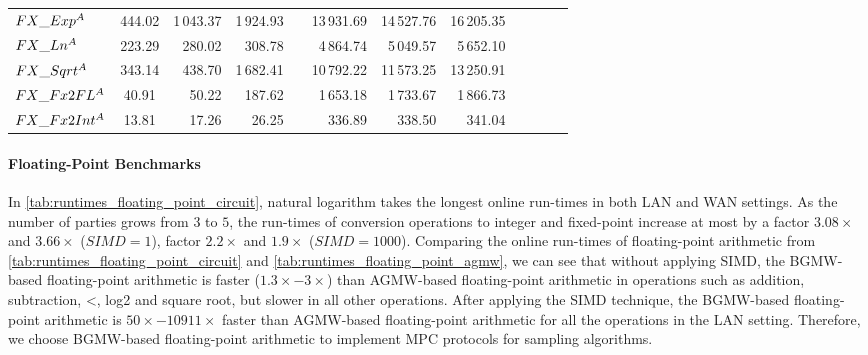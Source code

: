 \begin{table}
{\begin{tabular}{ l c r r r r r r r r r r}
            $FX\_Exp^{A}$                         & 444.02                  & 1\,043.37 & 1\,924.93               &   & 13\,931.69 & 14\,527.76 & 16\,205.35 \\
            $FX\_Ln^{A}$                          & 223.29                  & 280.02    & 308.78                  &   & 4\,864.74  & 5\,049.57  & 5\,652.10  \\
            $FX\_Sqrt^{A}$                        & 343.14                  & 438.70    & 1\,682.41               &   & 10\,792.22 & 11\,573.25 & 13\,250.91 \\
            $FX\_Fx2FL^{A}$                       & 40.91                   & 50.22     & 187.62                  &   & 1\,653.18  & 1\,733.67  & 1\,866.73  \\
            $FX\_Fx2Int^{A}$                      & 13.81                   & 17.26     & 26.25                   &   & 336.89     & 338.50     & 341.04     \\
            \bottomrule
        \end{tabular}
    }
\end{table}
\FloatBarrier

\paragraph{Floating-Point Benchmarks}
\label{para:Floating-PointBenchmarking}


In \autoref{tab:runtimes_floating_point_circuit}, natural logarithm takes the longest online run-times in both LAN and WAN settings. As the number of parties grows from $3$ to $5$, the run-times of conversion operations to integer and fixed-point increase at most by a factor $3.08\times$ and $3.66\times$ ($SIMD=1$), factor $2.2\times$ and $1.9\times$ ($SIMD=1000$).
Comparing the online run-times of floating-point arithmetic from \autoref{tab:runtimes_floating_point_circuit} and \autoref{tab:runtimes_floating_point_agmw}, we can see that without applying SIMD, the BGMW-based floating-point arithmetic is faster ($1.3\times-3\times$) than AGMW-based floating-point arithmetic in operations such as addition, subtraction, <, log2 and square root, but slower in all other operations. After applying the SIMD technique, the BGMW-based floating-point arithmetic is $50\times-10911\times$ faster than AGMW-based floating-point arithmetic for all the operations in the LAN setting.
Therefore, we choose BGMW-based floating-point arithmetic to implement MPC protocols for sampling algorithms.

